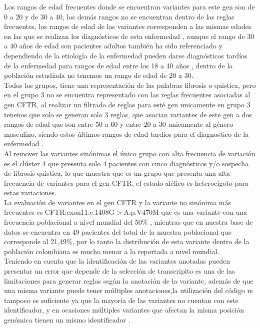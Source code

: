 Los rangos de edad frecuentes donde se encuentran variantes para este gen son de 0 a 20 y de 30 a 40, los demás rangos no se encuentran dentro de las reglas frecuentes, los rangos de edad de las variantes corresponden a las mismas edades en las que se realizan los diagnósticos de esta enfermedad \cite{Terlizzi2017b}, aunque el rango de 30 a 40 años de edad son pacientes adultos también ha sido referenciado y dependiendo de la etiología de la enfermedad pueden darse diagnósticos tardíos de la enfermedad para rangos de edad entre los 18 a 40 años \cite{Farrell2008}, dentro de la población estudiada no tenemos un rango de edad de 20 a 30. \\

Todos los grupos, tiene una representación de las palabras fibrosis o quistica, pero en el grupo 3 no se encuentra representado con las reglas frecuentes asociadas al gen CFTR, al realizar un filtrado de reglas para esté gen unicamente en grupo 3 tenenos que solo se generan solo 3 reglas, que asocian variantes de este gen a dos rangos de edad que son entre 50 a 60 y entre 20 a 30 unicamente al género masculino, siendo estos últimos rangos de edad tardíos para el diagnostico de la enfermedad \cite{Farrell2008}.\\

Al remover las variantes sinónimas el único grupo con alta frecuencia de variación es el clúster 4 que presenta solo 4 pacientes con cinco diagnósticos y/o sospecha de fibrosis quistica, lo que muestra que es un grupo que presenta una alta frecuencia de variantes para el gen CFTR, el estado alélico es heterocigoto para estas variaciones.\\

La evaluación de variantes en el gen CFTR y la variante no sinónima más frecuentes es CFTR:exon11:c.1408G$>$A:p.V470M que es una variante con una frecuencia poblacional a nivel mundial del 50\% \cite{Zerbino2018}, mientras que en  nuestra base de datos se encuentra en 49 pacientes del total de la muestra poblacional que corresponde al 21,49\%, por lo tanto la distribución de esta variante dentro de la población colombiana es mucho menor a la reportada a nivel mundial.\\

Teniendo en cuenta que la identificación de las variantes anotadas pueden presentar un error que depende de la selección de transcripito es una de las limitaciones para generar reglas según la anotación de la variante, además de que una misma variante puede tener múltiples anotaciones,la utilización del código rs tampoco es suficiente ya que la mayoría de las variantes no cuentan con este identificador, y en ocasiones múltiples variantes que afectan la misma posición genómica tienen un mismo identificador \cite{Liu2016,McCarthy2014}. \\  

